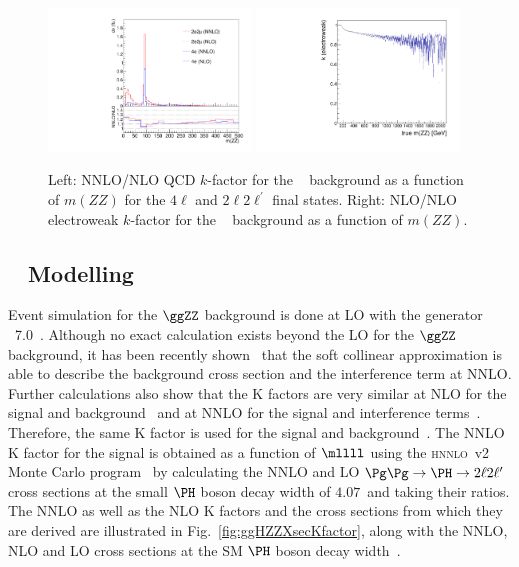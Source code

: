 \begin{figure}[!htb]
\vspace*{0.3cm}
\begin{center}
\includegraphics[width=0.48\textwidth]{Figures/IrrBkg/Kfactor_qqZZ_mZZ.pdf}
\includegraphics[width=0.48\textwidth]{Figures/IrrBkg/K_ewk_qqZZ.pdf} 
\caption{Left: NNLO/NLO QCD $k$-factor for the \qqZZ~ background as a function of $m(ZZ)$ for the $4\ell$ and $2\ell2\ell^{\prime}$ final states. Right: NLO/NLO electroweak $k$-factor for the \qqZZ~ background as a function of $m(ZZ)$.
\label{fig:qqZZKfactor}}
\end{center}
\end{figure}


\subsection{\ggZZ~ Modelling}

Event simulation for the $\ggZZ$ background is done at LO with the generator \MCFM~7.0~\cite{MCFM,Campbell:2011bn,Campbell:2013una}.
Although no exact calculation exists beyond the LO for the $\ggZZ$ background, 
it has been recently shown~\cite{Bonvini:1304.3053} 
that the soft collinear approximation is able to describe the background cross section and the 
interference term at NNLO\@. Further calculations also show that the K factors are very similar at NLO for the signal 
and background~\cite{Melnikov:2015laa} and at NNLO for the signal and interference terms~\cite{Li:2015jva}. Therefore, the same K factor 
is used for the signal and background~\cite{Passarino:1312.2397v1}. The NNLO K factor for the signal is obtained as a function of $\mllll$ 
using the \textsc{hnnlo}~v2 Monte Carlo program~\cite{Catani:2007vq,Grazzini:2008tf,Grazzini:2013mca} by calculating the NNLO and LO 
$\Pg\Pg\to\PH\to2\ell2\ell^\prime$ cross sections at the small $\PH$ boson decay width of $4.07$~\MeV and taking their ratios. The NNLO as 
well as the NLO K factors and the cross sections from which they are derived are illustrated in Fig.~\ref{fig:ggHZZXsecKfactor}, 
along with the NNLO, NLO and LO cross sections at the SM $\PH$ boson decay width~\cite{Heinemeyer:2013tqa}.
 
